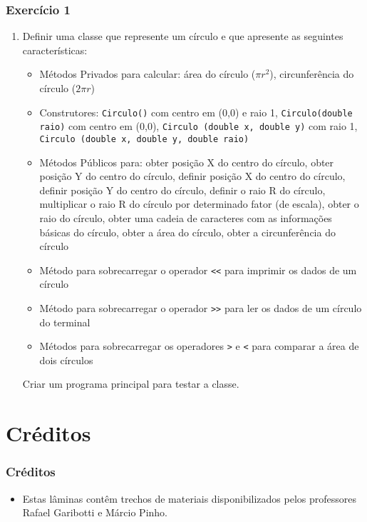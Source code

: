 \documentclass[aspectratio=169]{beamer}
\newcommand\setItemnumber[1]{\setcounter{enumi}{\numexpr#1-1\relax}}
\begin{document}
\begin{frame}\frametitle{Exercício 1}
\begin{enumerate}
	\setItemnumber{1}
	\item Definir uma classe que represente um círculo e que apresente as seguintes características:
	\begin{itemize}
		\item Métodos Privados para calcular: área do círculo ($\pi{}r^2$), circunferência do círculo ($2\pi{}r$)
		\item Construtores: \texttt{Circulo()} com centro em (0,0) e raio 1, \texttt{Circulo(double raio)} com centro em (0,0), \texttt{Circulo (double x, double y)} com raio 1, \texttt{Circulo (double x, double y, double raio)}
		\item Métodos Públicos para: obter posição X do centro do círculo, obter posição Y do centro do círculo, definir posição X do centro do círculo, definir posição Y do centro do círculo, definir o raio R do círculo, multiplicar o raio R do círculo por determinado fator (de escala), obter o raio do círculo, obter uma cadeia de caracteres com as informações básicas do círculo, obter a área do círculo, obter a circunferência do círculo
		\item Método para sobrecarregar o operador \texttt{\textless{}\textless} para imprimir os dados de um círculo
		\item Método para sobrecarregar o operador \texttt{\textgreater{}\textgreater{}} para ler os dados de um círculo do terminal
		\item Métodos para sobrecarregar os operadores \texttt{\textgreater{}} e \texttt{\textless{}} para comparar a área de dois círculos
	\end{itemize}
	Criar um programa principal para testar a classe.
\end{enumerate}
\end{frame}

\section{Créditos}

\begin{frame}\frametitle{Créditos}
\begin{itemize}
	\item Estas lâminas contêm trechos de materiais disponibilizados pelos professores Rafael Garibotti e Márcio Pinho.
\end{itemize}
\end{frame}
\end{document}
